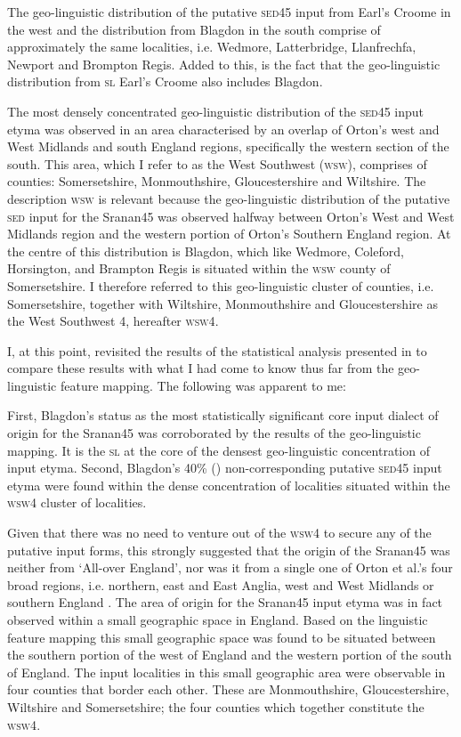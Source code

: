 The geo-linguistic distribution of the putative \textsc{sed45} input from Earl's Croome in the west and the distribution from Blagdon in the south comprise of approximately the same localities, i.e. Wedmore, Latterbridge, Llanfrechfa, Newport and Brompton Regis. Added to this, is the fact that the geo-linguistic distribution from \textsc{sl} Earl's Croome also includes Blagdon.

The most densely concentrated geo-linguistic distribution of the \textsc{sed45} input etyma was observed in an area characterised by an overlap of Orton's west and West Midlands and south England regions, specifically the western section of the south. This area, which I refer to as the West Southwest (\textsc{wsw}), comprises of counties: Somersetshire, Monmouthshire, Gloucestershire and Wiltshire. The description \textsc{wsw} is relevant because the geo-linguistic distribution of the putative \textsc{sed} input for the Sranan45 was observed halfway between Orton's West and West Midlands region and the western portion of Orton's Southern England region. At the centre of this distribution is Blagdon, which like Wedmore, Coleford, Horsington, and Brampton Regis is situated within the \textsc{wsw} county of Somersetshire. I therefore referred to this geo-linguistic cluster of counties, i.e. Somersetshire, together with Wiltshire, Monmouthshire and Gloucestershire as the West Southwest 4, hereafter \textsc{wsw4}.

I, at this point, revisited the results of the statistical analysis presented in  to compare these results with what I had come to know thus far from the geo-linguistic feature mapping. The following was apparent to me:

First, Blagdon's status as the most statistically significant core input dialect of origin for the Sranan45 was corroborated by the results of the geo-linguistic mapping. It is the \textsc{sl} at the core of the densest geo-linguistic concentration of input etyma. Second, Blagdon's 40\% () non-corresponding putative \textsc{sed45} input etyma were found within the dense concentration of localities situated within the \textsc{wsw4} cluster of localities.

Given that there was no need to venture out of the \textsc{wsw4} to secure any of the putative input forms, this strongly suggested that the origin of the Sranan45 was neither from `All-over England', nor was it from a single one of Orton et al.'s four broad regions, i.e. northern, east and East Anglia, west and West Midlands or southern England \citep{Orton6271}. The area of origin for the Sranan45 input etyma was in fact observed within a small geographic space in England. Based on the linguistic feature mapping this small geographic space was found to be situated between the southern portion of the west of England and the western portion of the south of England. The input localities in this small geographic area were observable in four counties that border each other. These are Monmouthshire, Gloucestershire, Wiltshire and Somersetshire; the four counties which together constitute the \textsc{wsw4}.


